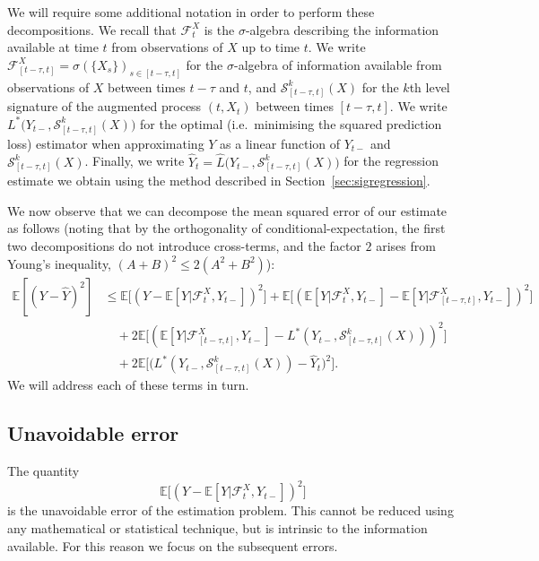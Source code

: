 \documentclass[a4paper, 12pt]{article}
\theoremstyle{remark}
\begin{document}
We will require some additional notation in order to perform these decompositions. We recall that $\mathcal{F}^X_t$ is the $\sigma$-algebra describing the information available at time $t$ from observations of $X$ up to time $t$. We write $\mathcal{F}^X_{[t-\tau, t]} = \sigma(\{X_s\})_{s\in [t-\tau, t]}$ for the $\sigma$-algebra of information available from observations of $X$ between times $t-\tau$ and $t$, and $\mathcal{S}^k_{[t-\tau, t]}(X)$ for the $k$th level signature of the augmented process $(t,X_t)$ between times $[t-\tau, t]$. We write $L^*\big(Y_{t-},\mathcal{S}^k_{[t-\tau, t]}(X)\big)$ for the optimal (i.e.~minimising the squared prediction loss) estimator when approximating $Y$ as a linear function of $Y_{t-}$ and $\mathcal{S}^k_{[t-\tau, t]}(X)$. Finally, we write $\hat Y_t = \hat L\big(Y_{t-},\mathcal{S}^k_{[t-\tau, t]}(X)\big)$ for the regression estimate we obtain using the method described in Section~\ref{sec:sigregression}.


We now observe that we can decompose the mean squared error of our estimate as follows (noting that by the orthogonality of conditional-expectation, the first two decompositions do not introduce cross-terms, and the factor $2$ arises from Young's inequality, $(A+B)^2 \leq 2(A^2+B^2)$):
\begin{align*}
    \mathbb{E}[(Y-\hat Y)^2] &\leq\mathbb{E}\Big[(Y-\mathbb{E}[Y|\mathcal{F}_t^X, Y_{t-}])^2\Big] + \mathbb{E}\Big[(\mathbb{E}[Y|\mathcal{F}_t^X,  Y_{t-}] - \mathbb{E}[Y|\mathcal{F}^X_{[t-\tau, t]},  Y_{t-}])^2\Big]\\
    &\quad + 2 \mathbb{E}\Big[(\mathbb{E}[Y|\mathcal{F}^X_{[t-\tau, t]},  Y_{t-}] -L^*(Y_{t-},\mathcal{S}^k_{[t-\tau, t]}(X)) )^2\Big]\\
    &\quad +  2\mathbb{E}\Big[\big(L^*(Y_{t-},\mathcal{S}^k_{[t-\tau, t]}(X))  -\hat Y_t\big)^2\Big].
\end{align*} 
We will address each of these terms in turn.

\subsection{Unavoidable error} 
The quantity
\[\mathbb{E}\Big[(Y-\mathbb{E}[Y|\mathcal{F}_t^X, Y_{t-}])^2\Big]\]
is the unavoidable error of the estimation problem. This cannot be reduced using any mathematical or statistical technique, but is intrinsic to the information available. For this reason we focus on the subsequent errors.
\end{document}
